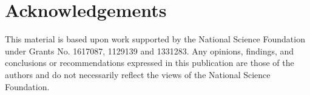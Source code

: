 \documentclass[sigconf]{acmart}
\begin{document}


\maketitle



\section{Acknowledgements}

This material is based upon work supported by the National Science Foundation under Grants No. 1617087, 1129139 and 1331283. Any opinions, findings, and conclusions or recommendations expressed in this publication are those of the authors and do not necessarily reflect the views of the National Science Foundation.

 

\end{document}
